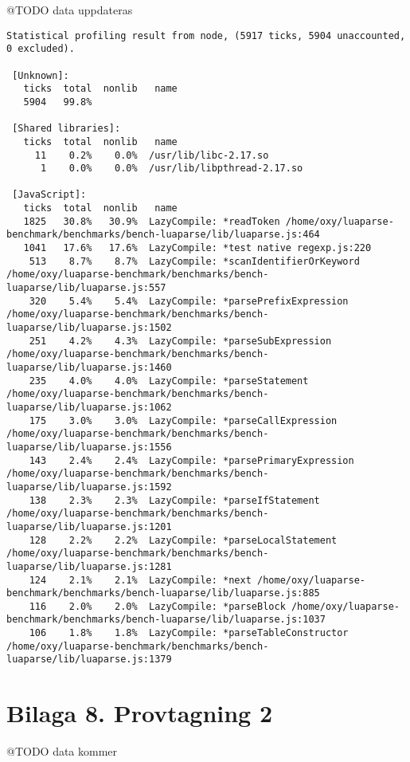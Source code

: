 @TODO data uppdateras
\begin{verbatim}
Statistical profiling result from node, (5917 ticks, 5904 unaccounted, 0 excluded).

 [Unknown]:
   ticks  total  nonlib   name
   5904   99.8%

 [Shared libraries]:
   ticks  total  nonlib   name
     11    0.2%    0.0%  /usr/lib/libc-2.17.so
      1    0.0%    0.0%  /usr/lib/libpthread-2.17.so

 [JavaScript]:
   ticks  total  nonlib   name
   1825   30.8%   30.9%  LazyCompile: *readToken /home/oxy/luaparse-benchmark/benchmarks/bench-luaparse/lib/luaparse.js:464
   1041   17.6%   17.6%  LazyCompile: *test native regexp.js:220
    513    8.7%    8.7%  LazyCompile: *scanIdentifierOrKeyword /home/oxy/luaparse-benchmark/benchmarks/bench-luaparse/lib/luaparse.js:557
    320    5.4%    5.4%  LazyCompile: *parsePrefixExpression /home/oxy/luaparse-benchmark/benchmarks/bench-luaparse/lib/luaparse.js:1502
    251    4.2%    4.3%  LazyCompile: *parseSubExpression /home/oxy/luaparse-benchmark/benchmarks/bench-luaparse/lib/luaparse.js:1460
    235    4.0%    4.0%  LazyCompile: *parseStatement /home/oxy/luaparse-benchmark/benchmarks/bench-luaparse/lib/luaparse.js:1062
    175    3.0%    3.0%  LazyCompile: *parseCallExpression /home/oxy/luaparse-benchmark/benchmarks/bench-luaparse/lib/luaparse.js:1556
    143    2.4%    2.4%  LazyCompile: *parsePrimaryExpression /home/oxy/luaparse-benchmark/benchmarks/bench-luaparse/lib/luaparse.js:1592
    138    2.3%    2.3%  LazyCompile: *parseIfStatement /home/oxy/luaparse-benchmark/benchmarks/bench-luaparse/lib/luaparse.js:1201
    128    2.2%    2.2%  LazyCompile: *parseLocalStatement /home/oxy/luaparse-benchmark/benchmarks/bench-luaparse/lib/luaparse.js:1281
    124    2.1%    2.1%  LazyCompile: *next /home/oxy/luaparse-benchmark/benchmarks/bench-luaparse/lib/luaparse.js:885
    116    2.0%    2.0%  LazyCompile: *parseBlock /home/oxy/luaparse-benchmark/benchmarks/bench-luaparse/lib/luaparse.js:1037
    106    1.8%    1.8%  LazyCompile: *parseTableConstructor /home/oxy/luaparse-benchmark/benchmarks/bench-luaparse/lib/luaparse.js:1379
\end{verbatim}

\clearpage
{}
\section*{Bilaga 8. Provtagning 2}

@TODO data kommer
\begin{verbatim}
\end{verbatim}
